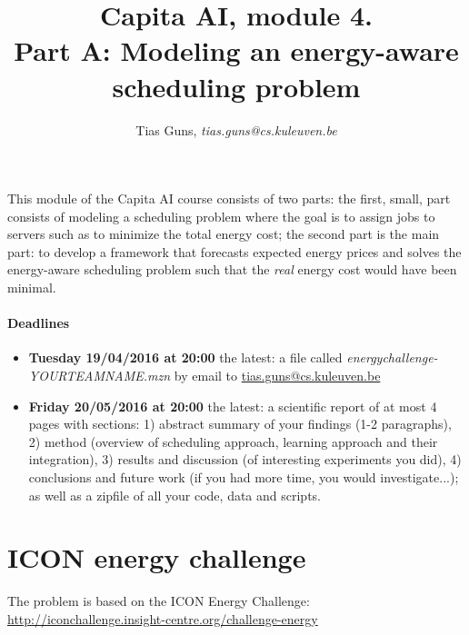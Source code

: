 \documentclass[a4,12pt]{article}
\title{Capita AI, module 4.\\Part A: Modeling an energy-aware scheduling problem}
\author{Tias Guns, \textit{tias.guns@cs.kuleuven.be}}
\begin{document}
\maketitle

This module of the Capita AI course consists of two parts: the first, small, part consists of modeling a scheduling problem where the goal is to assign jobs to servers such as to minimize the total energy cost; the second part is the main part: to develop a framework that forecasts expected energy prices and solves the energy-aware scheduling problem such that the \textit{real} energy cost would have been minimal.

\paragraph{Deadlines}
\begin{itemize}
\item \textbf{Tuesday 19/04/2016 at 20:00} the latest: a file called \textit{energychallenge-YOURTEAMNAME.mzn} by email to \url{tias.guns@cs.kuleuven.be}
\item \textbf{Friday 20/05/2016 at 20:00} the latest: a scientific report of at most 4 pages with sections: 1) abstract summary of your findings (1-2 paragraphs), 2) method (overview of scheduling approach, learning approach and their integration), 3) results and discussion (of interesting experiments you did), 4) conclusions and future work (if you had more time, you would investigate...); as well as a zipfile of all your code, data and scripts.
\end{itemize}


\section{ICON energy challenge}
The problem is based on the ICON Energy Challenge:\\
\url{http://iconchallenge.insight-centre.org/challenge-energy}
\end{document}
